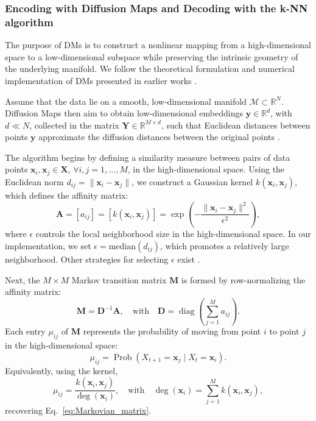 \documentclass{article}
\begin{document}
\subsubsection{Encoding with Diffusion Maps and Decoding with the k-NN algorithm}
\label{subsubsec:DMs}

The purpose of DMs is to construct a nonlinear mapping from a high-dimensional space to a low-dimensional subspace while preserving the intrinsic geometry of the underlying manifold. We follow the theoretical formulation and numerical implementation of DMs presented in earlier works \cite{dsilva2018parsimonious,holiday2019manifold,Patsatzis_2023,chin2024enabling,gallos2024data}. 

Assume that the data lie on a smooth, low-dimensional manifold $\mathcal{M} \subset \mathbb{R}^N$. Diffusion Maps then aim to obtain low-dimensional embeddings $\mathbf{y} \in \mathbb{R}^d$, with $d \ll N$, collected in the matrix $\mathbf{Y} \in \mathbb{R}^{M \times d}$, such that Euclidean distances between points $\mathbf{y}$ approximate the diffusion distances between the original points \cite{nadler2006diffusion}.

The algorithm begins by defining a similarity measure between pairs of data points $\boldsymbol{x}_i, \boldsymbol{x}_j \in \mathbf{X}$, $\forall i,j=1,\ldots,M$, in the high-dimensional space. Using the Euclidean norm $d_{ij} = \|\boldsymbol{x}_i - \boldsymbol{x}_j\|$, we construct a Gaussian kernel $k(\boldsymbol{x}_i, \boldsymbol{x}_j)$, which defines the affinity matrix:
\begin{equation}
	\mathbf{A} = [a_{ij}] = [k(\boldsymbol{x}_i, \boldsymbol{x}_j)] = \exp\left(-\frac{\|\boldsymbol{x}_i - \boldsymbol{x}_j\|^2}{\epsilon^2}\right),
	\label{eq:affinity_matrix}
\end{equation}
where $\epsilon$ controls the local neighborhood size in the high-dimensional space. In our implementation, we set $\epsilon = \mathrm{median}(d_{ij})$, which promotes a relatively large neighborhood. Other strategies for selecting $\epsilon$ exist \cite{singer2009detecting,gallos2021construction}.

Next, the $M \times M$ Markov transition matrix $\mathbf{M}$ is formed by row-normalizing the affinity matrix:
\begin{equation}
	\mathbf{M} = \mathbf{D}^{-1} \mathbf{A}, \quad \text{with} \quad \mathbf{D} = \operatorname{diag}\left(\sum_{j=1}^{M} a_{ij}\right).
	\label{eq:Markovian_matrix}
\end{equation}
Each entry $\mu_{ij}$ of $\mathbf{M}$ represents the probability of moving from point $i$ to point $j$ in the high-dimensional space:
\begin{equation}
	\mu_{ij} = \operatorname{Prob}\left(X_{t+1} = \boldsymbol{x}_j \mid X_t = \boldsymbol{x}_i\right).
\end{equation}
Equivalently, using the kernel,
\begin{equation}
	\mu_{ij} = \frac{k(\boldsymbol{x}_i, \boldsymbol{x}_j)}{\operatorname{deg}(\boldsymbol{x}_i)}, \quad \text{with} \quad \operatorname{deg}(\boldsymbol{x}_i) = \sum_{j=1}^{M} k(\boldsymbol{x}_i, \boldsymbol{x}_j),
\end{equation}
recovering Eq.~\eqref{eq:Markovian_matrix}.
\end{document}
